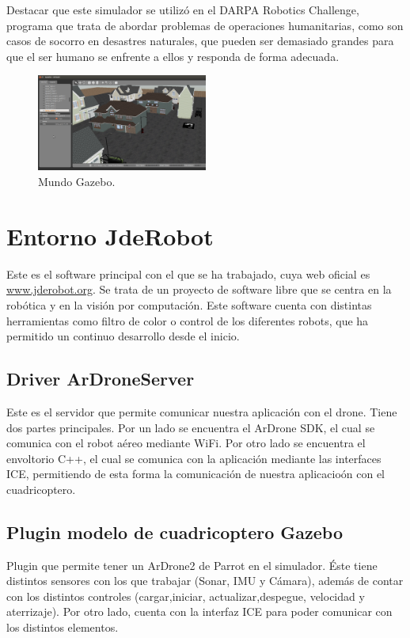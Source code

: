 \hspace{1 cm} Destacar que este simulador se utiliz\'o en el DARPA Robotics Challenge, programa que trata de abordar problemas de operaciones humanitarias, como son casos de socorro en desastres naturales, que pueden ser demasiado grandes para que el ser humano se enfrente a ellos y responda de forma adecuada.

\begin{figure}[H]
	\centering
		\includegraphics[width=0.5\textwidth]{imgs/gazeboworld.png}
				\caption{Mundo Gazebo.}
	\label{fig:MundoGazebo}
\end{figure}

\section{Entorno JdeRobot}
\hspace{1 cm} Este es el software principal con el que se ha trabajado, cuya web oficial es \underline{\url{www.jderobot.org}}. Se trata de un proyecto de software libre que se centra en la rob\'otica y en la visi\'on por computaci\'on. Este software cuenta con distintas herramientas como filtro de color o control de los diferentes robots, que ha permitido un continuo desarrollo desde el inicio. 


\subsection{Driver ArDroneServer}
\hspace{1 cm} Este es el servidor que permite comunicar nuestra aplicaci\'on con el drone. Tiene dos partes principales. Por un lado se encuentra el ArDrone SDK, el cual se comunica con el robot a\'ereo mediante WiFi. Por otro lado se encuentra el envoltorio C++, el cual se comunica con la aplicaci\'on mediante las interfaces ICE, permitiendo de esta forma la comunicaci\'on de nuestra aplicacio\'on con el cuadricoptero. 

\subsection{Plugin modelo de cuadricoptero Gazebo}
\hspace{1 cm} Plugin que permite tener un ArDrone2 de Parrot en el simulador. \'Este tiene distintos sensores con los que trabajar (Sonar, IMU y C\'amara), adem\'as de contar con los distintos controles (cargar,iniciar, actualizar,despegue, velocidad y aterrizaje). Por otro lado, cuenta con la interfaz ICE para poder comunicar con los distintos elementos. 




